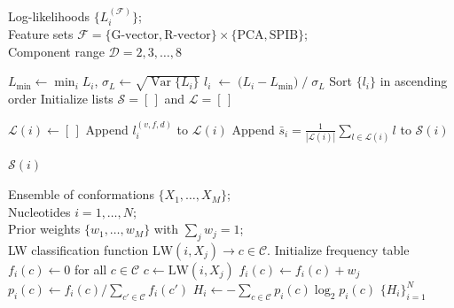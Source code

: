 \documentclass[%
aip,
 amsmath,amssymb,
reprint,%
twocolumn,
]{revtex4-1}
\begin{document}
{\begin{algorithm}[H]
  \caption{RNAnneal Score}
  \label{alg:rnanneal-score}
  \begin{algorithmic}[1]
    \REQUIRE  
    Log-likelihoods $\{L_{i}^{(\mathcal{F})}\}$;\\
    Feature sets $\mathcal{F}=\{\text{G-vector},\text{R-vector}\}\times\{\text{PCA},\text{SPIB}\}$;\\
    Component range $\mathcal{D}=2,3,\ldots,8$

    \STATE $\displaystyle L_{\min}\leftarrow\min_{i}L_{i}$,\quad 
           $\displaystyle\sigma_{L}\leftarrow\sqrt{\operatorname{Var}\{L_{i}\}}$
      \STATE $\displaystyle l_{i}\;\leftarrow\;
              {\bigl(L_{i}-L_{\min}\bigr)}\;
              {/\;\sigma_{L}}$ 
    \ENDFOR
      \STATE Sort $\{l_{i}\}$ in ascending order
      \STATE Initialize lists $\mathcal{S} = [\,]$ and $\mathcal{L} = [\,]$
    
        \STATE $\mathcal{L}(i)\gets[\,]$
              \STATE Append $l_{i}^{(v,f,d)}$ to $\mathcal{L}(i)$
            \ENDFOR
          \ENDFOR
        \STATE Append {$\displaystyle\bar{s}_{i}
               = \frac{1}{|\mathcal{L}(i)|}\sum_{l\in\mathcal{L}(i)}l$} to ${\mathcal{S}}(i)$
       
      \ENDFOR
      \RETURN ${\mathcal{S}}(i)$
  \end{algorithmic}
\end{algorithm}


\begin{algorithm}[H]
  \caption{Interaction Entropy calculation}
  \label{alg:interaction-entropy}
  \begin{algorithmic}[1]
    \REQUIRE Ensemble of conformations $\{X_{1},\dots,X_{M}\}$;\\
             Nucleotides $i=1,\dots,N$; \\
             Prior weights $\{w_{1},\dots,w_{M}\}$ with $\sum_{j} w_{j}=1$; \\
             LW classification function $\mathrm{LW}(i,X_{j}) \rightarrow c \in \mathcal{C}$.
      \STATE Initialize frequency table $f_{i}(c) \gets 0$ for all $c \in \mathcal{C}$
        \STATE $c \gets \mathrm{LW}(i,X_{j})$
        \STATE $f_{i}(c) \gets f_{i}(c) + w_{j}$
      \ENDFOR
      \STATE $p_{i}(c) \gets f_{i}(c) / \sum_{c' \in \mathcal{C}} f_{i}(c')$ 
      \STATE $H_{i} \gets -\sum_{c \in \mathcal{C}} p_{i}(c) \log_2 p_{i}(c)$
    \ENDFOR
    \RETURN $\{H_{i}\}_{i=1}^{N}$ 
  \end{algorithmic}
\end{algorithm}




}
\end{document}
